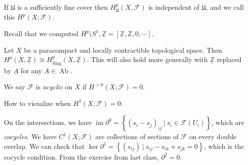 \begin{fact}

If \(\mathfrak{U}\) is a sufficiently fine cover then
\(H^p_{\mathfrak{U}}(X, \mathcal{F})\) is independent of
\(\mathfrak{U}\), and we call this \(H^p(X; \mathcal{F})\).

\end{fact}

\begin{remark}

Recall that we computed
\(H^p(S^1, \underline{{\mathbb{Z}}} = [{\mathbb{Z}}, {\mathbb{Z}}, 0, \cdots]\).

\end{remark}

\begin{theorem}[?]

Let \(X\) be a paracompact and locally contractible topological space.
Then
\(H^p(X, \underline{{\mathbb{Z}}}) \cong H^p_{{\operatorname{Sing}}}(X, \underline{{\mathbb{Z}}})\).
This will also hold more generally with \(\underline{{\mathbb{Z}}}\)
replaced by \(\underline{A}\) for any \(A\in {\operatorname{Ab}}\).

\end{theorem}

\begin{definition}

We say \(\mathcal{F}\) is \emph{acyclic} on \(X\) if
\(H^{> 0 }(X; \mathcal{F}) = 0\).

\end{definition}

\begin{remark}

How to visualize when \(H^1(X; \mathcal{F}) = 0\):

\begin{figure}
\centering
{}
\end{figure}

On the intersections, we have
\(\operatorname{im}{{\partial}}^0 = \left\{{ (s_{i} - s_{j})_{ij} {~\mathrel{\Big|}~}s_i \in \mathcal{F}(U_i)}\right\}\),
which are \emph{cocycles}. We have \(C^1(X; \mathcal{F})\) are
collections of sections of \(\mathcal{F}\) on every double overlap. We
can check that
\(\ker {{\partial}}^1 = \left\{{ (s_{ij}) {~\mathrel{\Big|}~}s_{ij} - s_{ik} + s_{jk} = 0}\right\}\),
which is the cocycle condition. From the exercise from last class,
\({{\partial}}^2 = 0\).

\end{remark}

